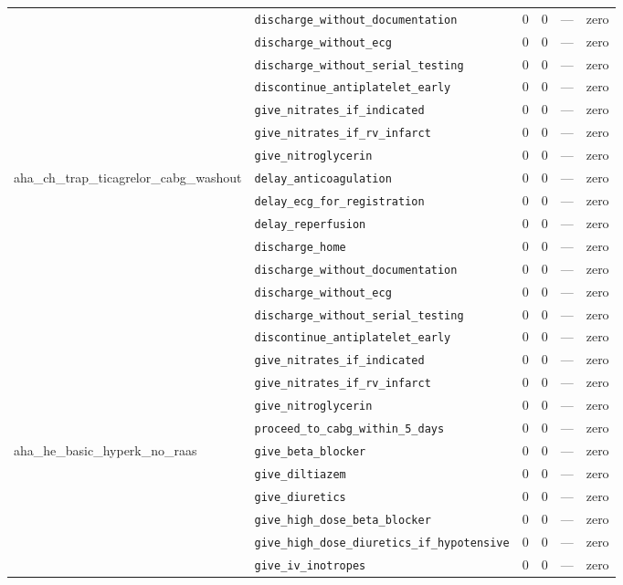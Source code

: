 \begin{table}[ht]
\begin{tabular}{llrrrl}
 & \texttt{discharge\_without\_documentation} & 0 & 0 & — & zero \\
 & \texttt{discharge\_without\_ecg} & 0 & 0 & — & zero \\
 & \texttt{discharge\_without\_serial\_testing} & 0 & 0 & — & zero \\
 & \texttt{discontinue\_antiplatelet\_early} & 0 & 0 & — & zero \\
 & \texttt{give\_nitrates\_if\_indicated} & 0 & 0 & — & zero \\
 & \texttt{give\_nitrates\_if\_rv\_infarct} & 0 & 0 & — & zero \\
 & \texttt{give\_nitroglycerin} & 0 & 0 & — & zero \\
\midrule
aha\_ch\_trap\_ticagrelor\_cabg\_washout & \texttt{delay\_anticoagulation} & 0 & 0 & — & zero \\
 & \texttt{delay\_ecg\_for\_registration} & 0 & 0 & — & zero \\
 & \texttt{delay\_reperfusion} & 0 & 0 & — & zero \\
 & \texttt{discharge\_home} & 0 & 0 & — & zero \\
 & \texttt{discharge\_without\_documentation} & 0 & 0 & — & zero \\
 & \texttt{discharge\_without\_ecg} & 0 & 0 & — & zero \\
 & \texttt{discharge\_without\_serial\_testing} & 0 & 0 & — & zero \\
 & \texttt{discontinue\_antiplatelet\_early} & 0 & 0 & — & zero \\
 & \texttt{give\_nitrates\_if\_indicated} & 0 & 0 & — & zero \\
 & \texttt{give\_nitrates\_if\_rv\_infarct} & 0 & 0 & — & zero \\
 & \texttt{give\_nitroglycerin} & 0 & 0 & — & zero \\
 & \texttt{proceed\_to\_cabg\_within\_5\_days} & 0 & 0 & — & zero \\
\midrule
aha\_he\_basic\_hyperk\_no\_raas & \texttt{give\_beta\_blocker} & 0 & 0 & — & zero \\
 & \texttt{give\_diltiazem} & 0 & 0 & — & zero \\
 & \texttt{give\_diuretics} & 0 & 0 & — & zero \\
 & \texttt{give\_high\_dose\_beta\_blocker} & 0 & 0 & — & zero \\
 & \texttt{give\_high\_dose\_diuretics\_if\_hypotensive} & 0 & 0 & — & zero \\
 & \texttt{give\_iv\_inotropes} & 0 & 0 & — & zero \\

\end{tabular}
\end{table}
